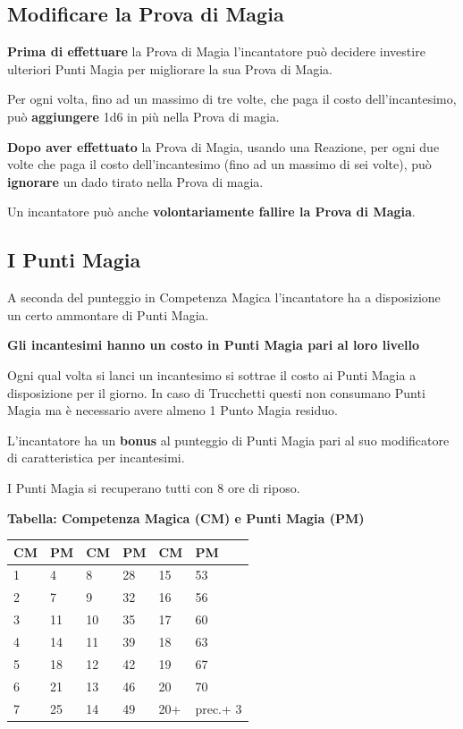 \begin{multicols}{2}
\subsection{Modificare la Prova di Magia}

\textbf{Prima di effettuare} la Prova di Magia l'incantatore può decidere investire ulteriori Punti Magia per migliorare la sua Prova di Magia.

Per ogni volta, fino ad un massimo di tre volte, che paga il costo dell'incantesimo, può \textbf{aggiungere} 1d6 in più nella Prova di magia. 

\textbf{Dopo aver effettuato} la Prova di Magia, usando una Reazione, per ogni due volte che paga il costo dell'incantesimo (fino ad un massimo di sei volte), può \textbf{ignorare} un dado tirato nella Prova di magia. 

Un incantatore può anche \textbf{volontariamente fallire la Prova di Magia}.


\subsection{I Punti Magia}\label{magiepuntimagia}\hypertarget{magiepuntimagia}{}

A seconda del punteggio in Competenza Magica l'incantatore ha a disposizione un certo ammontare di Punti Magia.

\textbf{Gli incantesimi hanno un costo in Punti Magia pari al loro livello}

Ogni qual volta si lanci un incantesimo si sottrae il costo ai Punti Magia a disposizione per il giorno.
In caso di Trucchetti questi non consumano Punti Magia ma è necessario avere almeno 1 Punto Magia residuo.

L'incantatore ha un \textbf{bonus} al punteggio di Punti Magia pari al suo modificatore di caratteristica per incantesimi.

I Punti Magia si recuperano tutti con 8 ore di riposo. 


\medskip

\textbf{Tabella: Competenza Magica (CM) e Punti Magia (PM)}

\medskip

\noindent\begin{tabularx}{\linewidth}{XX|XX|XX}
	\toprule
 \rowcolor{gray!20}\textbf{CM} & \textbf{PM}&\textbf{CM} & \textbf{PM}&\textbf{CM} & \textbf{PM}\\
	\toprule
	1&	4  &	8&	28&	15&	53\\
 \rowcolor{gray!20}2&	7  &	9&	32&	16&	56\\
	3&	11 &	10&	35&	17&	60\\
 \rowcolor{gray!20}4&	14 &	11&	39&	18&	63\\
	5&	18 &	12&	42&	19&	67\\
 \rowcolor{gray!20}6&	21 &	13&	46&	20&	70\\
	7&	25 & 	14&	49&	20+&	prec.+ 3
\end{tabularx}


\end{multicols}
